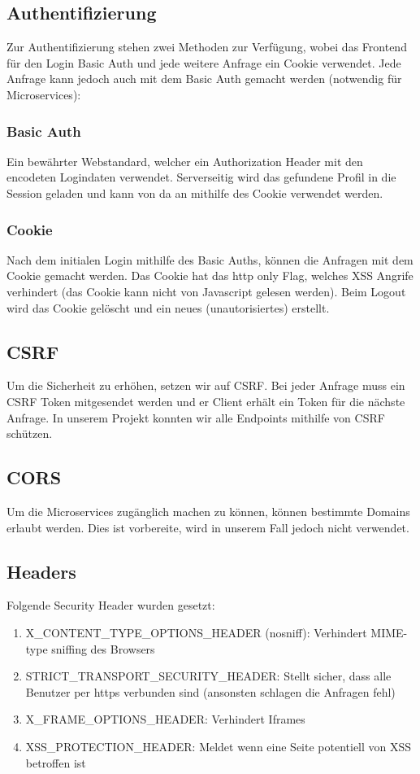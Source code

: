 \documentclass[11pt]{article} %
\begin{document}
\subsection{Authentifizierung}
Zur Authentifizierung stehen zwei Methoden zur Verfügung, wobei das Frontend für den Login Basic Auth und jede weitere Anfrage ein Cookie verwendet. Jede Anfrage kann jedoch auch mit dem Basic Auth gemacht werden (notwendig für Microservices):

\subsubsection{Basic Auth}
Ein bewährter Webstandard, welcher ein Authorization Header mit den encodeten Logindaten verwendet. Serverseitig wird das gefundene Profil in die Session geladen und kann von da an mithilfe des Cookie verwendet werden.

\subsubsection{Cookie}
Nach dem initialen Login mithilfe des Basic Auths, können die Anfragen mit dem Cookie gemacht werden. Das Cookie hat das http only Flag, welches XSS Angrife verhindert (das Cookie kann nicht von Javascript gelesen werden). Beim Logout wird das Cookie gelöscht und ein neues (unautorisiertes) erstellt.

\subsection{CSRF}
Um die Sicherheit zu erhöhen, setzen wir auf CSRF. Bei jeder Anfrage muss ein CSRF Token mitgesendet werden und er Client erhält ein Token für die nächste Anfrage. In unserem Projekt konnten wir alle Endpoints mithilfe von CSRF schützen.

\subsection{CORS}
Um die Microservices zugänglich machen zu können, können bestimmte Domains erlaubt werden. Dies ist vorbereite, wird in unserem Fall jedoch nicht verwendet.

\subsection{Headers}

Folgende Security Header wurden gesetzt:

\begin{enumerate}
\item X\_CONTENT\_TYPE\_OPTIONS\_HEADER (nosniff): Verhindert MIME-type sniffing des Browsers
\item STRICT\_TRANSPORT\_SECURITY\_HEADER: Stellt sicher, dass alle Benutzer per https verbunden sind (ansonsten schlagen die Anfragen fehl)
\item X\_FRAME\_OPTIONS\_HEADER: Verhindert Iframes
\item XSS\_PROTECTION\_HEADER: Meldet wenn eine Seite potentiell von XSS betroffen ist
\end{enumerate}
\end{document}
